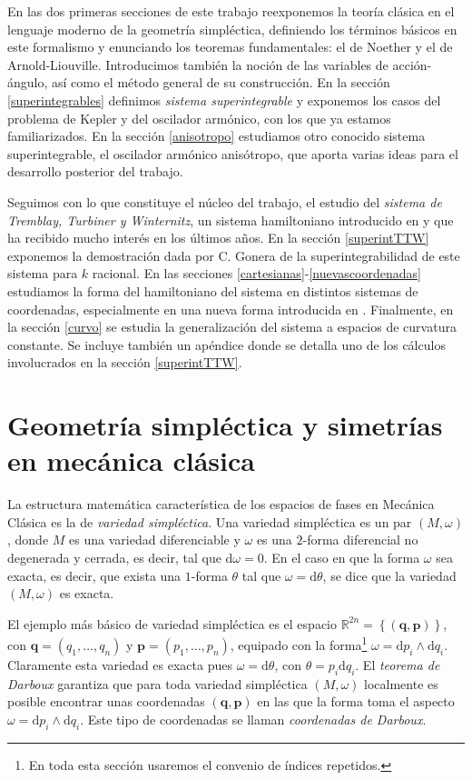 \documentclass[11pt,a4paper,twoside]{article}
\theoremstyle{definition} \newtheorem{defn}[thm]{Definición}
\theoremstyle{definition} \newtheorem{ejemplo}[thm]{Ejemplo}
\theoremstyle{definition} \newtheorem{ejercicio}[thm]{Ejercicio}
\theoremstyle{remark} \newtheorem*{obs}{Observación}
\def\RR{\mathbb{R}}
\def\dd{\mathrm{d}}
\newcommand{\vect}[1]{\mathbf{#1}}
\begin{document}
En las dos primeras secciones de este trabajo reexponemos la teoría clásica en el lenguaje moderno de la geometría simpléctica, definiendo los términos básicos en este formalismo y enunciando los teoremas fundamentales: el de Noether y el de Arnold-Liouville. Introducimos también la noción de las variables de acción-ángulo, así como el método general de su construcción. En la sección \ref{superintegrables} definimos \emph{sistema superintegrable} y exponemos los casos del problema de Kepler y del oscilador armónico, con los que ya estamos familiarizados. En la sección \ref{anisotropo} estudiamos otro conocido sistema superintegrable, el oscilador armónico anisótropo, que aporta varias ideas para el desarrollo posterior del trabajo.

Seguimos con lo que constituye el núcleo del trabajo, el estudio del \emph{sistema de Tremblay, Turbiner y Winternitz}, un sistema hamiltoniano introducido en \cite{ttw1} y que ha recibido mucho interés en los últimos años. En la sección \ref{superintTTW} exponemos la demostración dada por C. Gonera \cite{gonera} de la superintegrabilidad de este sistema para $k$ racional. En las secciones \ref{cartesianas}-\ref{nuevascoordenadas} estudiamos la forma del hamiltoniano del sistema en distintos sistemas de coordenadas, especialmente en una nueva forma introducida en \cite{burgos}. Finalmente, en la sección \ref{curvo} se estudia la generalización del sistema a espacios de curvatura constante. Se incluye también un apéndice donde se detalla uno de los cálculos involucrados en la sección \ref{superintTTW}.

\section{Geometría simpléctica y simetrías en mecánica clásica}
La estructura matemática característica de los espacios de fases en Mecánica Clásica es la de \emph{variedad simpléctica}. Una variedad simpléctica es un par $(M,\omega)$, donde $M$ es una variedad diferenciable y $\omega$ es una $2$-forma diferencial no degenerada y cerrada, es decir, tal que $\dd \omega=0$. En el caso en que la forma $\omega$ sea exacta, es decir, que exista una $1$-forma $\theta$ tal que $\omega=\dd \theta$, se dice que la variedad $(M,\omega)$ es exacta. 

El ejemplo más básico de variedad simpléctica es el espacio $\RR^{2n}=\left\{ (\vect{q},\vect{p}) \right\}$, con $\vect{q}=(q_1,\dots,q_n)$ y $\vect{p}=(p_1,\dots,p_n)$, equipado con la forma\footnote{En toda esta sección usaremos el convenio de índices repetidos.} $\omega=\dd p_i \wedge \dd q_i$. Claramente esta variedad es exacta pues $\omega=\dd \theta$, con $\theta=p_i \dd q_i$. El \emph{teorema de Darboux} garantiza que para toda variedad simpléctica $(M,\omega)$ localmente es posible encontrar unas coordenadas $(\vect{q},\vect{p})$ en las que la forma toma el aspecto $\omega=\dd p_i \wedge \dd q_i$. Este tipo de coordenadas se llaman \emph{coordenadas de Darboux}.
\end{document}
